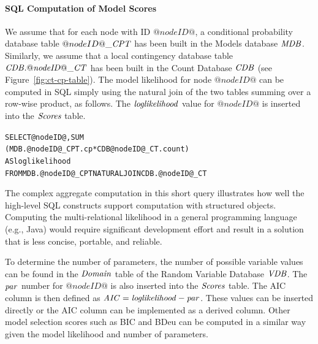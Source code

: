 \documentclass{acm_proc_article-sp}
\newcommand{\ct}{\mathit{ct}}
\begin{document}
\paragraph{SQL Computation of Model Scores} We assume that for each node with ID $@nodeID@$, a conditional probability database table $@nodeID@\_\it{CPT}$ has been built in the Models database $\it{MDB}$. Similarly, we assume that
a local contingency database table $\it{CDB}.@nodeID@\_\it{CT}$ has been built in the Count Database $\it{CDB}$ (see Figure~\ref{fig:ct-cp-table}). The model likelihood for node $@nodeID@$ can be computed in SQL simply using the natural join of the two tables summing over a row-wise product, as follows. The $\it{loglikelihood}$ value for $@nodeID@$ is inserted into the $\it{Scores}$ table. 
\begin{alltt}
SELECT @nodeID@,  SUM
(MDB.@nodeID@\_CPT.cp * CDB@nodeID@\_CT.count) 
AS loglikelihood
FROM MDB.@nodeID@\_CPT NATURAL JOIN CDB.@nodeID@\_CT
\end{alltt}


The complex aggregate computation in this short query illustrates how well the high-level SQL constructs support computation with structured objects. Computing the multi-relational likelihood in a general programming language (e.g., Java) would require significant development effort and result in a solution that is less concise, portable, and reliable.

To determine the number of parameters, the number of possible variable values can be found in the $\it{Domain}$ table of the Random Variable Database $\it{VDB}$.  The $\mathit{par}$ number for $@nodeID@$ is also inserted into the $\it{Scores}$ table. The AIC column is then defined as $\mathit{AIC} = \it{loglikelihood} - \mathit{par}$. These values can be inserted directly or the AIC column can be implemented as a derived column. %
%
Other model selection scores such as BIC and BDeu can be computed in a similar way given the model likelihood and number of parameters.
\end{document}
